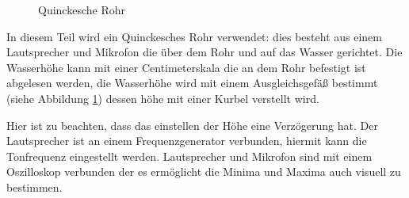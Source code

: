 \documentclass[11pt,a4paper]{article}
\begin{document}
\begin{figure}
	\centering \vspace{-20pt}
	\vspace{-5pt}
	\caption{Quinckesche Rohr \cite{Anleitung}}
	\label{abb1}
\end{figure}

In diesem Teil wird ein Quinckesches Rohr verwendet: dies besteht aus einem Lautsprecher und Mikrofon die über dem Rohr und auf das Wasser gerichtet. Die Wasserhöhe kann mit einer Centimeterskala die an dem Rohr befestigt ist abgelesen werden, die Wasserhöhe wird mit einem Ausgleichsgefäß bestimmt (siehe Abbildung \ref{abb1}) dessen höhe mit einer Kurbel verstellt wird.

 Hier ist zu beachten, dass das einstellen der Höhe eine Verzögerung hat. Der Lautsprecher ist an einem Frequenzgenerator verbunden, hiermit kann die Tonfrequenz eingestellt werden. Lautsprecher und Mikrofon sind mit einem Oszilloskop verbunden der es ermöglicht die Minima und Maxima auch visuell zu bestimmen. 
\end{document}
